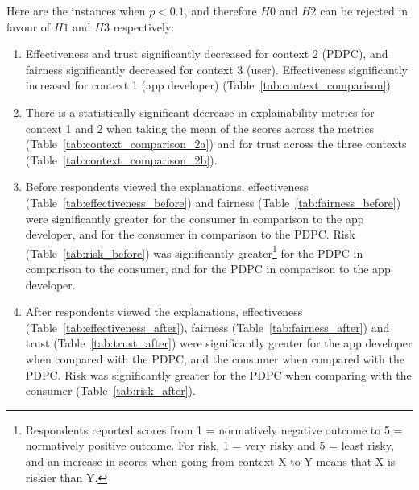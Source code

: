 Here are the instances when $p<0.1$, and therefore $H0$ and $H2$ can be rejected in favour of $H1$ and $H3$ respectively:
\begin{enumerate}
    \item Effectiveness and trust significantly decreased for context 2 (PDPC), and fairness significantly decreased for context 3 (user). Effectiveness significantly increased for context 1 (app developer) (Table~\ref{tab:context_comparison}).
    
    \item There is a statistically significant decrease in explainability metrics for context 1 and 2 when taking the mean of the scores across the metrics (Table~\ref{tab:context_comparison_2a}) and for trust across the three contexts (Table~\ref{tab:context_comparison_2b}). 
    
    \item Before respondents viewed the explanations, effectiveness (Table~\ref{tab:effectiveness_before}) and fairness (Table~\ref{tab:fairness_before}) were significantly greater for the consumer in comparison to the app developer, and for the consumer in comparison to the PDPC. Risk (Table~\ref{tab:risk_before}) was significantly greater\footnote{Respondents reported scores from 1 = normatively negative outcome to 5 = normatively positive outcome. For risk, 1 = very risky and 5 = least risky, and an increase in scores when going from context X to Y means that X is riskier than Y.} for the PDPC in comparison to the consumer, and for the PDPC in comparison to the app developer.

    \item After respondents viewed the explanations, effectiveness (Table~\ref{tab:effectiveness_after}), fairness (Table~\ref{tab:fairness_after}) and trust (Table~\ref{tab:trust_after}) were significantly greater for the app developer when compared with the PDPC, and the consumer when compared with the PDPC. Risk was significantly greater for the PDPC when comparing with the consumer (Table~\ref{tab:risk_after}).
\end{enumerate}

